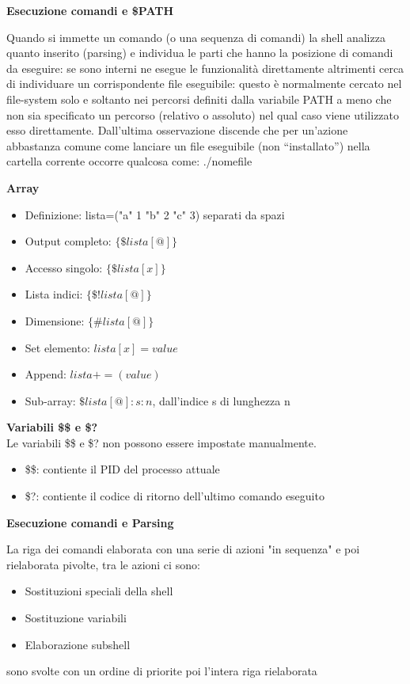 \begin{flushleft}
  \textbf{Esecuzione comandi e \$PATH}\par
  Quando si immette un comando (o una sequenza di comandi) la shell analizza 
  quanto inserito (parsing) e individua le parti che hanno la posizione di comandi 
  da eseguire: se sono interni ne esegue le funzionalità direttamente altrimenti 
  cerca di individuare un corrispondente file eseguibile: questo è normalmente
  cercato nel file-system solo e soltanto nei percorsi definiti dalla variabile PATH a 
  meno che non sia specificato un percorso (relativo o assoluto) nel qual caso viene 
  utilizzato esso direttamente.
  Dall'ultima osservazione discende che per un'azione abbastanza comune come 
  lanciare un file eseguibile (non “installato”) nella cartella corrente occorre 
  qualcosa come: ./nomefile
\end{flushleft}
\begin{flushleft}
  \textbf{Array}\par 
  \begin{itemize}
    \item Definizione: lista=("a" 1 "b" 2 "c" 3) separati da spazi
    \item Output completo: $\{\$lista[@]\}$
    \item Accesso singolo: $\{\$lista[x]\}$
    \item Lista indici: $\{\$!lista[@]\}$
    \item Dimensione: $\{\#lista[@]\}$
    \item Set elemento: $lista[x] = value$
    \item Append: $lista+=(value)$
    \item Sub-array: $\$lista[@]:s:n$, dall'indice s di lunghezza n
  \end{itemize}
\end{flushleft}
\begin{flushleft}
  \textbf{Variabili \$\$ e \$?}\\
  Le variabili \$\$ e \$? non possono essere impostate manualmente.
  \begin{itemize}
    \item \$\$: contiente il PID del processo attuale
    \item \$?: contiente il codice di ritorno dell'ultimo comando eseguito
  \end{itemize}
\end{flushleft}
\begin{flushleft}
  \textbf{Esecuzione comandi e Parsing}\par 
  La riga dei comandi \ace elaborata con una serie di azioni "in sequenza" e poi 
  rielaborata pi\acu volte, tra le azioni ci sono:
  \begin{itemize}
    \item Sostituzioni speciali della shell
    \item Sostituzione variabili
    \item Elaborazione subshell
  \end{itemize}
  sono svolte con un ordine di priorit\aca e poi l'intera riga \ace rielaborata
\end{flushleft}
